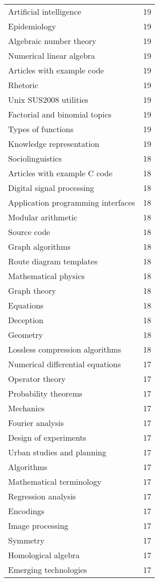 \begin{appendices}
\begin{longtable} {|| p{20em} | p{5em} ||}
Artificial intelligence	&	19	\\
Epidemiology	&	19	\\
Algebraic number theory	&	19	\\
Numerical linear algebra	&	19	\\
Articles with example code	&	19	\\
Rhetoric	&	19	\\
Unix SUS2008 utilities	&	19	\\
Factorial and binomial topics	&	19	\\
Types of functions	&	19	\\
Knowledge representation	&	19	\\
Sociolinguistics	&	18	\\
Articles with example C code	&	18	\\
Digital signal processing	&	18	\\
Application programming interfaces	&	18	\\
Modular arithmetic	&	18	\\
Source code	&	18	\\
Graph algorithms	&	18	\\
Route diagram templates	&	18	\\
Mathematical physics	&	18	\\
Graph theory	&	18	\\
Equations	&	18	\\
Deception	&	18	\\
Geometry	&	18	\\
Lossless compression algorithms	&	18	\\
Numerical differential equations	&	17	\\
Operator theory	&	17	\\
Probability theorems	&	17	\\
Mechanics	&	17	\\
Fourier analysis	&	17	\\
Design of experiments	&	17	\\
Urban studies and planning	&	17	\\
Algorithms	&	17	\\
Mathematical terminology	&	17	\\
Regression analysis	&	17	\\
Encodings	&	17	\\
Image processing	&	17	\\
Symmetry	&	17	\\
Homological algebra	&	17	\\
Emerging technologies	&	17	\\

\end{longtable}
\end{appendices}
